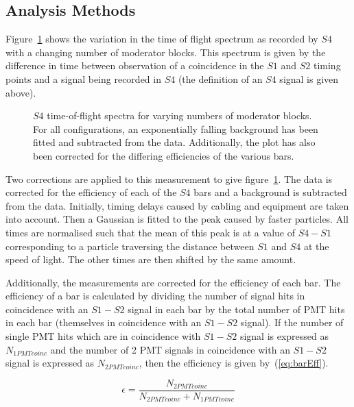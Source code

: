 \subsection{Analysis Methods}

	Figure~\ref{fig:s4tof} shows the variation in the time of flight spectrum as recorded by $S4$ with a changing number of moderator blocks.
	This spectrum is given by the difference in time between observation of a coincidence in the $S1$ and $S2$ timing points and a signal being recorded in $S4$ (the definition of an $S4$ signal is given above).
	
	\begin{figure}[h]
		\begin{adjustbox}{max totalsize={.8\textwidth}{.5\textheight},center}
			
		\end{adjustbox}
		\caption{$S4$ time-of-flight spectra for varying numbers of moderator blocks. For all configurations, an exponentially falling background has been fitted and subtracted from the data. Additionally, the plot has also been corrected for the differing efficiencies of the various bars.}
		\label{fig:s4tof}	
	\end{figure}

	Two corrections are applied to this measurement to give figure~\ref{fig:s4tof}. 
	The data is corrected for the efficiency of each of the $S4$ bars and a background is subtracted from the data.
	Initially, timing delays caused by cabling and equipment are taken into account.
	Then a Gaussian is fitted to the peak caused by faster particles.
	All times are normalised such that the mean of this peak is at a value of $S4 - S1$ corresponding to a particle traversing the distance between $S1$ and $S4$ at the speed of light. 
	The other times are then shifted by the same amount.
	
	Additionally, the measurements are corrected for the efficiency of each bar. 
	The efficiency of a bar is calculated by dividing the number of signal hits in coincidence with an $S1-S2$ signal in each bar by the total number of PMT hits in each bar (themselves in coincidence with an $S1-S2$ signal). 
	If the number of single PMT hits which are in coincidence with $S1-S2$ signal is expressed as $N_{1PMTcoinc}$ and the number of 2 PMT signals in coincidence with an $S1-S2$ signal is expressed as $N_{2PMTcoinc}$, then the efficiency is given by~(\ref{eq:barEff}).
	
	\begin{equation}
		\epsilon = \frac{N_{2PMTcoinc}}{N_{2PMTcoinc}+N_{1PMTcoinc}}
		\label{eq:barEff}
	\end{equation}
	
